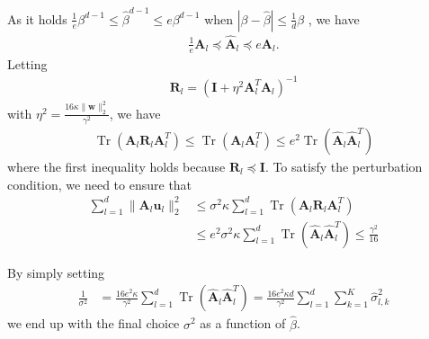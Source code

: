 \documentclass[journal]{IEEEtran} %
\def\vu{{\bm{u}}}
\def\vw{{\bm{w}}}
\def\mA{{\bm{A}}}
\def\mI{{\bm{I}}}
\def\mR{{\bm{R}}}
\newcommand{\Norm}[1]{\|#1\|}
\newcommand{\Abs}[1]{|#1|}
\DeclareMathOperator{\Tr}{Tr}
\begin{document}
As it holds $\frac{1}{e} \beta^{d-1} \le \hat{\beta}^{d-1} \le e\beta^{d-1}$ when $\Abs{\beta-\hat{\beta}} \le \frac{1}{d}\beta$ \cite{neyshabur2018pac}, we have
\begin{align}
   \frac{1}{e} \mA_l \preceq \hat{\mA}_l \preceq e \mA_l.
\end{align}
Letting
\begin{align} \label{eq:low-rank-Rl}
    {\mR}_l  = (\mI+\eta^2 \mA_{l}^T \mA_{l} )^{-1}
\end{align}
with $\eta^2=\frac{16   \kappa \Norm{\vw}_2^2}{\gamma^2}$, we have
\begin{align}
    \Tr({\mA}_l {\mR}_l {\mA}_l^T) \le \Tr({\mA}_l {\mA}_l^T) \le e^2\Tr(\hat{\mA}_l \hat{\mA}_l^T)
\end{align}
where the first inequality holds because $\mR_l \preceq \mI$.
To satisfy the perturbation condition, we need to ensure that
\begin{align}
   \sum_{l=1}^d \Norm{{\mA}_l \vu_l}_2^2 &\le \sigma^2 \kappa \sum_{l=1}^d \Tr({\mA}_l {\mR}_l {\mA}_l^T)\\
   &\le e^2 \sigma^2 \kappa \sum_{l=1}^d \Tr(\hat{\mA}_l \hat{\mA}_l^T)
   \le  \frac{\gamma^2}{16}
\end{align}
 
By simply setting
\begin{align} \label{eq:sigma-upper-low-rank}
    \frac{1}{{\sigma}^2} &= \frac{16e^2 \kappa}{\gamma^2} \sum_{l=1}^d \Tr(\hat{\mA}_l  \hat{\mA}_l^T)=\frac{16e^2 \kappa d}{\gamma^2} \sum_{l=1}^d \sum_{k=1}^K \hat{\sigma}^2_{l,k}
\end{align}
we end up with the final choice ${\sigma}^2$ as a function of $\hat{\beta}$.
\end{document}
